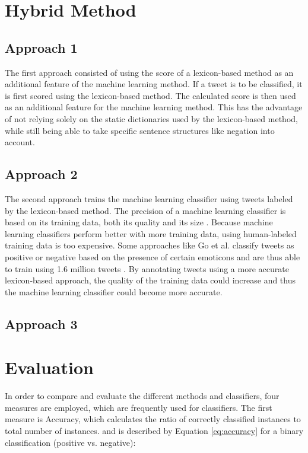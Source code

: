 \section{Hybrid Method}

\subsection{Approach 1}
The first approach consisted of using the score of a lexicon-based method as an additional feature of the machine learning method. If a tweet is to be classified, it is first scored using the lexicon-based method. The calculated score is then used as an additional feature for the machine learning method. This has the advantage of not relying solely on the static dictionaries used by the lexicon-based method, while still being able to take specific sentence structures like negation into account.
\subsection{Approach 2}
The second approach trains the machine learning classifier using tweets labeled by the lexicon-based method. The precision of a machine learning classifier is based on its training data, both its quality and its size \cite{DBLP:journals/csur/GiachanouC16}. Because machine learning classifiers perform better with more training data, using human-labeled training data is too expensive. Some approaches like Go et al. classify tweets as positive or negative based on the presence of certain emoticons and are thus able to train using 1.6 million tweets \cite{GoBHaHua2009}. By annotating tweets using a more accurate lexicon-based approach, the quality of the training data could increase and thus the machine learning classifier could become more accurate.
\subsection{Approach 3}


\section{Evaluation}
In order to compare and evaluate the different methods and classifiers, four measures are employed, which are frequently used for classifiers. The first measure is Accuracy, which calculates the ratio of correctly classified instances to total number of instances. and is described by Equation \eqref{eq:accuracy} for a binary classification (positive vs. negative):

